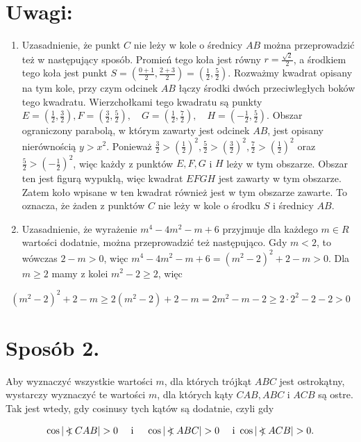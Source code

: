 \documentclass[10pt]{article}
\newcommand\Varangle{\mathop{{<\!\!\!\!\!\text{\small)}}\:}\nolimits}
\begin{document}
\section*{Uwagi:}
\begin{enumerate}
  \item Uzasadnienie, że punkt $C$ nie leży w kole o średnicy $A B$ można przeprowadzić też w następujący sposób. Promień tego koła jest równy $r=\frac{\sqrt{2}}{2}$, a środkiem tego koła jest punkt $S=\left(\frac{0+1}{2}, \frac{2+3}{2}\right)=\left(\frac{1}{2}, \frac{5}{2}\right)$. Rozważmy kwadrat opisany na tym kole, przy czym odcinek $A B$ łączy środki dwóch przeciwległych boków tego kwadratu. Wierzchołkami tego kwadratu są punkty $E=\left(\frac{1}{2}, \frac{3}{2}\right), F=\left(\frac{3}{2}, \frac{5}{2}\right), \quad G=\left(\frac{1}{2}, \frac{7}{2}\right), \quad H=\left(-\frac{1}{2}, \frac{5}{2}\right)$. Obszar ograniczony parabolą, w którym zawarty jest odcinek $A B$, jest opisany nierównością $y>x^{2}$. Ponieważ $\frac{3}{2}>\left(\frac{1}{2}\right)^{2}, \frac{5}{2}>\left(\frac{3}{2}\right)^{2}, \frac{7}{2}>\left(\frac{1}{2}\right)^{2}$ oraz $\frac{5}{2}>\left(-\frac{1}{2}\right)^{2}$, więc każdy z punktów $E, F, G$ i $H$ leży w tym obszarze. Obszar ten jest figurą wypukłą, więc kwadrat $E F G H$ jest zawarty w tym obszarze. Zatem koło wpisane w ten kwadrat również jest w tym obszarze zawarte. To oznacza, że żaden z punktów $C$ nie leży w kole o środku $S$ i średnicy $A B$.
  \item Uzasadnienie, że wyrażenie $m^{4}-4 m^{2}-m+6$ przyjmuje dla każdego $m \in R$ wartości dodatnie, można przeprowadzić też następująco. Gdy $m<2$, to wówczas $2-m>0$, więc $m^{4}-4 m^{2}-m+6=\left(m^{2}-2\right)^{2}+2-m>0$. Dla $m \geq 2$ mamy z kolei $m^{2}-2 \geq 2$, więc
\end{enumerate}

$$
\left(m^{2}-2\right)^{2}+2-m \geq 2\left(m^{2}-2\right)+2-m=2 m^{2}-m-2 \geq 2 \cdot 2^{2}-2-2>0
$$

\section*{Sposób 2.}
Aby wyznaczyć wszystkie wartości $m$, dla których trójkąt $A B C$ jest ostrokątny, wystarczy wyznaczyć te wartości $m$, dla których kąty $C A B, A B C$ i $A C B$ są ostre. Tak jest wtedy, gdy cosinusy tych kątów są dodatnie, czyli gdy

$$
\cos |\Varangle C A B|>0 \quad \text { i } \quad \cos |\Varangle A B C|>0 \quad \text { i } \cos |\Varangle A C B|>0 .
$$
\end{document}
